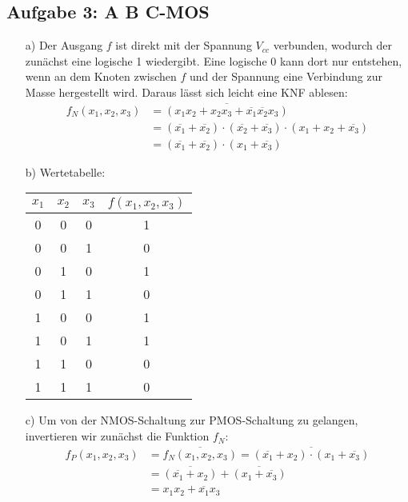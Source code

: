 \documentclass{article}
\begin{document}
	\subsection*{Aufgabe 3: A B C-MOS}
	\begin{enumerate}
		\item[a)] Der Ausgang $f$ ist direkt mit der Spannung $V_{cc}$ verbunden, wodurch der zunächst eine logische 1 wiedergibt. Eine logische 0 kann dort nur entstehen, wenn an dem Knoten zwischen $f$ und der Spannung eine Verbindung zur Masse hergestellt wird. Daraus lässt sich leicht eine KNF ablesen: 
		\begin{align*}
			f_N(x_1, x_2, x_3) &= \overline{(x_1 x_2 + x_2 x_3 + \overline{x_1} \overline{x_2} x_3)} \\
			&= (\overline{x_1} + \overline{x_2}) \cdot (\overline{x_2} + \overline{x_3}) \cdot (x_1 + x_2 + \overline{x_3}) \\
			&= (\overline{x_1} + \overline{x_2}) \cdot (x_1 + \overline{x_3})
		\end{align*} 
		\item[b)] Wertetabelle:
		\begin{table*}[h]
			\centering
			\begin{tabular}{ccc|c}
				$x_1$ & $x_2$ & $x_3 $ & $f(x_1, x_2, x_3)$ \\ \hline
				0 & 0 & 0 & 1 \\
				0 & 0 & 1 & 0 \\
				0 & 1 & 0 & 1 \\
				0 & 1 & 1 & 0 \\
				1 & 0 & 0 & 1 \\
				1 & 0 & 1 & 1 \\
				1 & 1 & 0 & 0 \\
				1 & 1 & 1 & 0
			\end{tabular}
		\end{table*}
		\item[c)] Um von der NMOS-Schaltung zur PMOS-Schaltung zu gelangen, invertieren wir zunächst die Funktion $f_N$:
		\begin{align*}
			f_P(x_1, x_2, x_3) &= \overline{f_N(x_1, x_2, x_3)} = \overline{(\overline{x_1} + x_2) \cdot (x_1 + \overline{x_3})} \\
			&= \overline{(\overline{x_1} + x_2)} + \overline{(x_1 + \overline{x_3})} \\
			&= x_1 x_2 + \overline{x_1} x_3
		\end{align*}
		
	\end{enumerate}
\end{document}
